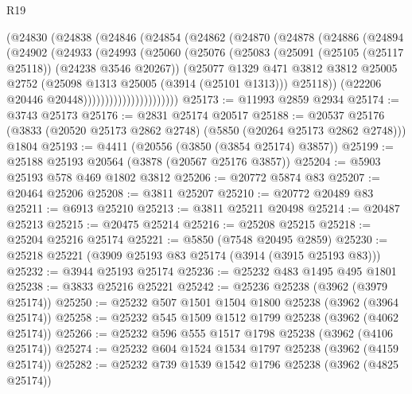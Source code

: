 \begin{lexlean}{R19}
\begin{coremodule}
                  (@24830
                    (@24838
                      (@24846
                        (@24854
                          (@24862
                            (@24870
                              (@24878
                                (@24886
                                  (@24894
                                    (@24902
                                      (@24933
                                        (@24993
                                          (@25060
                                            (@25076
                                              (@25083
                                                (@25091
                                                  (@25105 (@25117 @25118))
                                                  (@24238 @3546 @20267))
                                                (@25077
                                                  @1329
                                                  @471
                                                  @3812
                                                  @3812
                                                  @25005
                                                  @2752
                                                  (@25098 @1313 @25005 (@3914 (@25101 @1313)))
                                                  @25118))
                                              (@22206 @20446 @20448))))))))))))))))))))))
@25173 := @11993 @2859 @2934
@25174 := @3743 @25173
@25176 := @2831 @25174 @20517
@25188 := @20537
    @25176
    (@3833 (@20520 @25173 @2862 @2748) (@5850 (@20264 @25173 @2862 @2748)))
    @1804
@25193 := @4411 (@20556 (@3850 (@3854 @25174) @3857))
@25199 := @25188 @25193 @20564 (@3878 (@20567 @25176 @3857))
@25204 := @5903 @25193 @578 @469 @1802 @3812
@25206 := @20772 @5874 @83
@25207 := @20464 @25206
@25208 := @3811 @25207
@25210 := @20772 @20489 @83
@25211 := @6913 @25210
@25213 := @3811 @25211 @20498
@25214 := @20487 @25213
@25215 := @20475 @25214
@25216 := @25208 @25215
@25218 := @25204 @25216 @25174
@25221 := @5850 (@7548 @20495 @2859)
@25230 := @25218 @25221 (@3909 @25193 @83 @25174 (@3914 (@3915 @25193 @83)))
@25232 := @3944 @25193 @25174
@25236 := @25232 @483 @1495 @495 @1801
@25238 := @3833 @25216 @25221
@25242 := @25236 @25238 (@3962 (@3979 @25174))
@25250 := @25232 @507 @1501 @1504 @1800 @25238 (@3962 (@3964 @25174))
@25258 := @25232 @545 @1509 @1512 @1799 @25238 (@3962 (@4062 @25174))
@25266 := @25232 @596 @555 @1517 @1798 @25238 (@3962 (@4106 @25174))
@25274 := @25232 @604 @1524 @1534 @1797 @25238 (@3962 (@4159 @25174))
@25282 := @25232 @739 @1539 @1542 @1796 @25238 (@3962 (@4825 @25174))

\end{coremodule}
\end{lexlean}
